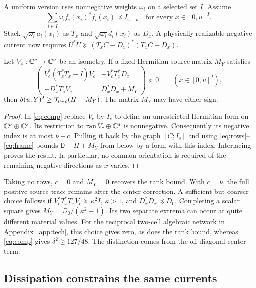 A uniform version uses nonnegative weights $\omega_i$ on a selected set $I$. Assume
\begin{equation}
 \sum_{i\in I}\omega_i f_i(x_i)^*f_i(x_i)\preceq I_{n-\nu}
 \quad \text{for every }x\in[0,u]^I .                     \label{eq:frame}
\end{equation}
Stack $\sqrt{\omega_i}a_i(x_i)$ as $T_x$ and $\sqrt{\omega_i}d_i(x_i)$ as $D_x$. A physically realizable negative current now requires $U^*U\succeq(T_x C-D_x)^*(T_x C-D_x)$.

\begin{theorem}\label{th:comp}
Let $V_c:\mathbb C^c\to\mathbb C^\nu$ be an isometry. If a fixed Hermitian source matrix $M_Y$ satisfies
\begin{equation}
 \begin{pmatrix}
 V_c^*(T_x^*T_x-I)V_c &-V_c^*T_x^*D_x\\
 -D_x^*T_x V_c & D_x^*D_x+M_Y
 \end{pmatrix}\succeq0\qquad(x\in[0,u]^I),                    \label{eq:comp}
\end{equation}
then $\delta(u;Y)^2\ge\mathcal T_{\nu-c}(H-M_Y)$. The matrix $M_Y$ may have either sign.
\end{theorem}
\begin{proof}
In \eqref{eq:comp} replace $V_c$ by $I_\nu$ to define an unrestricted Hermitian form on $\mathbb C^\nu\oplus\mathbb C^s$. Its restriction to $\operatorname{ran} V_c\oplus\mathbb C^s$ is nonnegative. Consequently its negative index is at most $\nu-c$. Pulling it back by the graph $[C;I_s]$ and using \eqref{eq:rows}--\eqref{eq:frame} bounds $\mathsf D-H+M_Y$ from below by a form with this index. Interlacing proves the result. In particular, no common orientation is required of the remaining negative directions as $x$ varies.
\end{proof}

Taking no rows, $c=0$ and $M_Y=0$ recovers the rank bound. With $c=\nu$, the full positive source trace remains after the center correction. A sufficient but coarser choice follows if $V_c^*T_x^*T_xV_c\succeq\kappa^2 I$, $\kappa>1$, and $D_x^*D_x\preceq D_0$. Completing a scalar square gives $M_Y=D_0/(\kappa^2-1)$. Its two separate extrema can occur at quite different material values. For the reciprocal two-cell algebraic network in Appendix~\ref{app:tech}, this choice gives zero, as does the rank bound, whereas \eqref{eq:comp} gives $\delta^2\ge127/48$. The distinction comes from the off-diagonal center term.

\subsection{Dissipation constrains the same currents}

